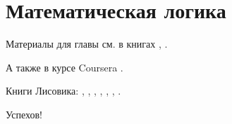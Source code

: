 \chapter{Математическая логика}

Материалы для главы см. в книгах \cite{galiev2002}, \cite{kolmogorov2006}.

А также в курсе Coursera \cite{c:l-i}.

Книги Лисовика:
\cite{lisovik2005b1},
\cite{lisovik2005b2},
\cite{lisovik2005b3},
\cite{lisovik2006b4},
\cite{lisovik2006b5},
\cite{lisovik2007b6},
\cite{lisovik2007}.

Успехов!
